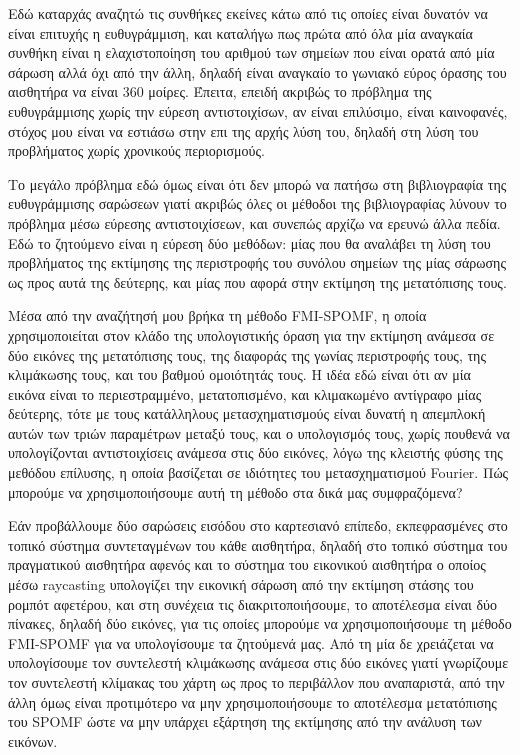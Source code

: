 \documentclass[a4paper,10pt]{article}
\begin{document}
Εδώ καταρχάς αναζητώ τις συνθήκες εκείνες κάτω από τις οποίες είναι δυνατόν να
είναι επιτυχής η ευθυγράμμιση, και καταλήγω πως πρώτα από όλα μία αναγκαία
συνθήκη είναι η ελαχιστοποίηση του αριθμού των σημείων που είναι ορατά από μία
σάρωση αλλά όχι από την άλλη, δηλαδή είναι αναγκαίο το γωνιακό εύρος όρασης του
αισθητήρα να είναι 360 μοίρες. Έπειτα, επειδή ακριβώς το πρόβλημα της
ευθυγράμμισης χωρίς την εύρεση αντιστοιχίσων, αν είναι επιλύσιμο, είναι
καινοφανές, στόχος μου είναι να εστιάσω στην επι της αρχής λύση του, δηλαδή
στη λύση του προβλήματος χωρίς χρονικούς περιορισμούς.

Το μεγάλο πρόβλημα εδώ όμως είναι ότι δεν μπορώ να πατήσω στη βιβλιογραφία της
ευθυγράμμισης σαρώσεων γιατί ακριβώς όλες οι μέθοδοι της βιβλιογραφίας λύνουν
το πρόβλημα μέσω εύρεσης αντιστοιχίσεων, και συνεπώς αρχίζω να ερευνώ άλλα
πεδία. Εδώ το ζητούμενο είναι η εύρεση δύο μεθόδων: μίας που θα αναλάβει τη
λύση του προβλήματος της εκτίμησης της περιστροφής του συνόλου σημείων της μίας
σάρωσης ως προς αυτά της δεύτερης, και μίας που αφορά στην εκτίμηση της
μετατόπισης τους.

Μέσα από την αναζήτησή μου βρήκα τη μέθοδο FMI-SPOMF, η οποία χρησιμοποιείται
στον κλάδο της υπολογιστικής όραση για την εκτίμηση ανάμεσα σε δύο εικόνες
της μετατόπισης τους, της διαφοράς της γωνίας περιστροφής τους, της κλιμάκωσης
τους, και του βαθμού ομοιότητάς τους. Η ιδέα εδώ είναι ότι αν μία εικόνα είναι
το περιεστραμμένο, μετατοπισμένο, και κλιμακωμένο αντίγραφο μίας δεύτερης, τότε
με τους κατάλληλους μετασχηματισμούς είναι δυνατή η απεμπλοκή αυτών των τριών
παραμέτρων μεταξύ τους, και ο υπολογισμός τους, χωρίς πουθενά να υπολογίζονται
αντιστοιχίσεις ανάμεσα στις δύο εικόνες, λόγω της κλειστής φύσης της μεθόδου
επίλυσης, η οποία βασίζεται σε ιδιότητες του μετασχηματισμού Fourier.  Πώς
μπορούμε να χρησιμοποιήσουμε αυτή τη μέθοδο στα δικά μας συμφραζόμενα?

Εάν προβάλλουμε δύο σαρώσεις εισόδου στο καρτεσιανό επίπεδο, εκπεφρασμένες στο
τοπικό σύστημα συντεταγμένων του κάθε αισθητήρα, δηλαδή στο τοπικό σύστημα του
πραγματικού αισθητήρα αφενός και το σύστημα του εικονικού αισθητήρα ο οποίος
μέσω raycasting υπολογίζει την εικονική σάρωση από την εκτίμηση στάσης του
ρομπότ αφετέρου, και στη συνέχεια τις διακριτοποιήσουμε, το αποτέλεσμα είναι
δύο πίνακες, δηλαδή δύο εικόνες, για τις οποίες μπορούμε να
χρησιμοποιήσουμε τη μέθοδο FMI-SPOMF για να υπολογίσουμε τα ζητούμενά μας.  Από
τη μία δε χρειάζεται να υπολογίσουμε τον συντελεστή κλιμάκωσης ανάμεσα στις δύο
εικόνες γιατί γνωρίζουμε τον συντελεστή κλίμακας του χάρτη ως προς το
περιβάλλον που αναπαριστά, από την άλλη όμως είναι προτιμότερο να μην
χρησιμοποιήσουμε το αποτέλεσμα μετατόπισης του SPOMF ώστε να μην υπάρχει
εξάρτηση της εκτίμησης από την ανάλυση των εικόνων.
\end{document}
